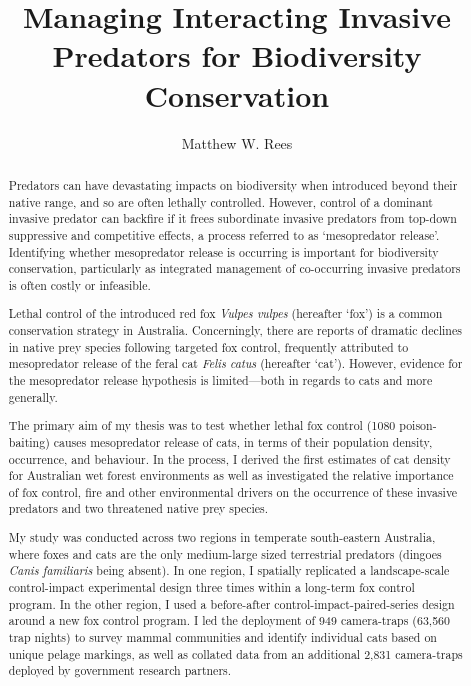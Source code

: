 \documentclass[11pt,a4paper,titlepage,twoside,openright]{style/unimelbthesis}
\title{Managing Interacting Invasive Predators for Biodiversity Conservation}
\author{Matthew W. Rees}
\begin{document}
\begin{frontmatter}


  \maketitle

  \begin{abstract}
    Predators can have devastating impacts on biodiversity when introduced beyond their native range, and so are often lethally controlled. However, control of a dominant invasive predator can backfire if it frees subordinate invasive predators from top-down suppressive and competitive effects, a process referred to as `mesopredator release'. Identifying whether mesopredator release is occurring is important for biodiversity conservation, particularly as integrated management of co-occurring invasive predators is often costly or infeasible.

    Lethal control of the introduced red fox \emph{Vulpes vulpes} (hereafter `fox') is a common conservation strategy in Australia. Concerningly, there are reports of dramatic declines in native prey species following targeted fox control, frequently attributed to mesopredator release of the feral cat \emph{Felis catus} (hereafter `cat'). However, evidence for the mesopredator release hypothesis is limited---both in regards to cats and more generally.

    The primary aim of my thesis was to test whether lethal fox control (1080 poison-baiting) causes mesopredator release of cats, in terms of their population density, occurrence, and behaviour. In the process, I derived the first estimates of cat density for Australian wet forest environments as well as investigated the relative importance of fox control, fire and other environmental drivers on the occurrence of these invasive predators and two threatened native prey species.

    My study was conducted across two regions in temperate south-eastern Australia, where foxes and cats are the only medium-large sized terrestrial predators (dingoes \emph{Canis familiaris} being absent). In one region, I spatially replicated a landscape-scale control-impact experimental design three times within a long-term fox control program. In the other region, I used a before-after control-impact-paired-series design around a new fox control program. I led the deployment of 949 camera-traps (63,560 trap nights) to survey mammal communities and identify individual cats based on unique pelage markings, as well as collated data from an additional 2,831 camera-traps deployed by government research partners.


\end{abstract}
\end{frontmatter}
\end{document}
